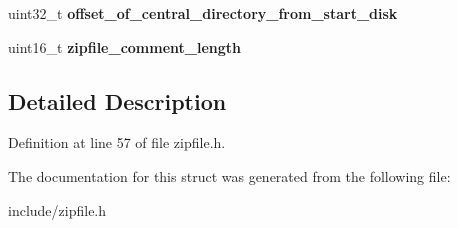 \begin{DoxyCompactItemize}
\item 
\hypertarget{structpkzip__central__directory__header__end_aa11a9b7bfe4d09a708d29b41652950ff}{uint32\-\_\-t {\bfseries offset\-\_\-of\-\_\-central\-\_\-directory\-\_\-from\-\_\-start\-\_\-disk}}\label{structpkzip__central__directory__header__end_aa11a9b7bfe4d09a708d29b41652950ff}

\item 
\hypertarget{structpkzip__central__directory__header__end_ab6833dfb4b1fcd94689a0499d2a6365b}{uint16\-\_\-t {\bfseries zipfile\-\_\-comment\-\_\-length}}\label{structpkzip__central__directory__header__end_ab6833dfb4b1fcd94689a0499d2a6365b}

\end{DoxyCompactItemize}


\subsection{Detailed Description}


Definition at line 57 of file zipfile.\-h.



The documentation for this struct was generated from the following file\-:\begin{DoxyCompactItemize}
\item 
include/zipfile.\-h\end{DoxyCompactItemize}
